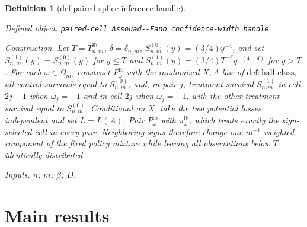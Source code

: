 \documentclass{article}
\newtheorem{definition}{Definition}
\begin{document}
\begin{definition}[def:paired-splice-inference-handle]\label{def:paired-splice-inference-handle}
\par\smallskip\noindent\emph{Defined object.} \texttt{paired-\allowbreak{}cell Assouad-\allowbreak{}-\allowbreak{}Fano confidence-\allowbreak{}width handle}
\par\smallskip\noindent\emph{Construction.} Let \(T=T^{\mathrm{lb}}_{n,m}\), \(\delta=\delta_{n,m}\), \(S^{(0)}_{n,m}(y)=(3/4)y^{-4}\), and set \(S^{(1)}_{n,m}(y)=S^{(0)}_{n,m}(y)\) for \(y\le T\) and \(S^{(1)}_{n,m}(y)=(3/4)T^{-\delta}y^{-(4-\delta)}\) for \(y>T\). For each \(\omega\in\Omega_m\), construct \(P^{\mathrm{lb}}_{\omega}\) with the randomized \(X,A\) law of \(\mathrm{def{:}hall\text{-}class}\), all control survivals equal to \(S^{(0)}_{n,m}\), and, in pair \(j\), treatment survival \(S^{(1)}_{n,m}\) in cell \(2j-1\) when \(\omega_j=+1\) and in cell \(2j\) when \(\omega_j=-1\), with the other treatment survival equal to \(S^{(0)}_{n,m}\). Conditional on \(X\), take the two potential losses independent and set \(L=L(A)\). Pair \(P^{\mathrm{lb}}_{\omega}\) with \(\pi^{\mathrm{lb}}_{\omega}\), which treats exactly the sign-selected cell in every pair. Neighboring signs therefore change one \(m^{-1}\)-weighted component of the fixed policy mixture while leaving all observations below \(T\) identically distributed.
\par\smallskip\noindent\emph{Inputs.} \(n\); \(m\); \(\beta\); \(D\).
\end{definition}

\section{Main results}
\end{document}
